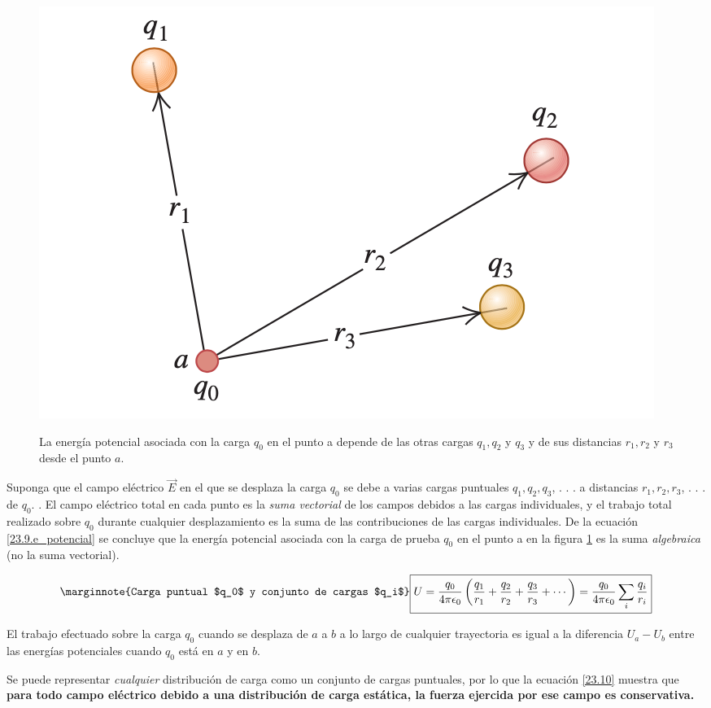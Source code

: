 \begin{figure}[h]
\centering
\caption{La energía potencial asociada con la carga $q_0$ en el punto a depende de las otras cargas $q_1, q_2$ y $q_3$ y de sus distancias $r_1, r_2$ y $r_3$ desde el punto $a$.}
\includegraphics[scale=0.4]{fig/e_potencial_varias}
\label{fig:e_potencial_varias}
\end{figure}

Suponga que el campo eléctrico $\vec{E}$ en el que se desplaza la carga $q_0$ se debe a varias cargas puntuales $q_1, q_2, q_3$, . . . a distancias $r_1, r_2, r_3$, . . . de $q_0$. . El campo eléctrico total en cada punto es la \textit{suma vectorial} de los campos debidos a las cargas individuales, y el trabajo total realizado sobre $q_0$ durante cualquier desplazamiento es la suma de las contribuciones de las cargas individuales. De la ecuación \ref{23.9.e_potencial} se concluye que la energía potencial asociada con la carga de prueba $q_0$ en el punto a en la figura \ref{fig:e_potencial_varias} es la suma \textit{algebraica} (no la suma vectorial).

\begin{equation}\label{23.10}\marginnote{Carga puntual $q_0$ y conjunto de cargas $q_i$}
\boxed{U=\frac{q_0}{4\pi\epsilon_0}\left(\frac{q_1}{r_1}+\frac{q_2}{r_2}+\frac{q_3}{r_3}+\cdots \right)=\frac{q_0}{4\pi\epsilon_0}\sum_{i}\frac{q_i}{r_i}}
\end{equation}

El trabajo efectuado sobre la carga $q_0$ cuando se desplaza de $a$ a $b$ a lo largo de cualquier trayectoria es igual a la diferencia $U_a-U_b$ entre las energías potenciales cuando $q_0$ está en $a$ y en $b$.

Se puede representar \textit{cualquier} distribución de carga como un conjunto de cargas puntuales, por lo que la ecuación \ref{23.10} muestra que \textbf{para todo campo eléctrico debido a una distribución de carga estática, la fuerza ejercida por ese campo es conservativa.}

